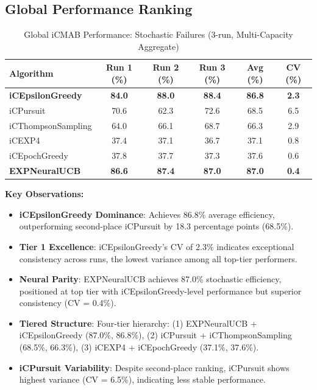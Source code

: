 \documentclass[12pt,a4paper]{article}
\newcommand{\primarytext}[1]{\textcolor{primaryblue}{\textbf{#1}}}
\newcommand{\secondarytext}[1]{\textcolor{secondaryblue}{\textbf{#1}}}
\newcommand{\warning}[1]{\textcolor{warningred}{\textbf{#1}}}
\newcommand{\legacy}[1]{\textcolor{legacycolor}{\textbf{#1}}}
\begin{document}
\begin{tcolorbox}[colback=tableheader,colframe=primaryblue,title=\textbf{Primary iCMAB Performance Results (Stochastic Environment, Attack Rate: 0.25)}]

\subsection{Global Performance Ranking}

\begin{table}[H]
\centering
\caption{Global iCMAB Performance: Stochastic Failures (3-run, Multi-Capacity Aggregate)}
\label{tab:global-performance-stochastic}
\begin{tabular}{@{}lccccc@{}}
\toprule
\textbf{Algorithm} & \textbf{Run 1 (\%)} & \textbf{Run 2 (\%)} & \textbf{Run 3 (\%)} & \textbf{Avg (\%)} & \textbf{CV (\%)} \\
\midrule
\primarytext{iCEpsilonGreedy}   & \primarytext{84.0} & \primarytext{88.0} & \primarytext{88.4} & \primarytext{86.8} & \primarytext{2.3} \\
iCPursuit                       & 70.6 & 62.3 & 72.6 & 68.5 & 6.5 \\
iCThompsonSampling              & 64.0 & 66.1 & 68.7 & 66.3 & 2.9 \\
iCEXP4                          & 37.4 & 37.1 & 36.7 & 37.1 & 0.8 \\
iCEpochGreedy                   & 37.8 & 37.7 & 37.3 & 37.6 & 0.6 \\
\legacy{EXPNeuralUCB}           & \legacy{86.6} & \legacy{87.4} & \legacy{87.0} & \legacy{87.0} & \legacy{0.4} \\
\bottomrule
\end{tabular}
\end{table}

\textbf{Key Observations:}
\begin{itemize}
\item \primarytext{iCEpsilonGreedy Dominance}: Achieves 86.8\% average efficiency, outperforming second-place iCPursuit by 18.3 percentage points (68.5\%).
\item \primarytext{Tier 1 Excellence}: iCEpsilonGreedy's CV of 2.3\% indicates exceptional consistency across runs, the lowest variance among all top-tier performers.
\item \legacy{Neural Parity}: EXPNeuralUCB achieves 87.0\% stochastic efficiency, positioned at top tier with iCEpsilonGreedy-level performance but superior consistency (CV = 0.4\%).
\item \secondarytext{Tiered Structure}: Four-tier hierarchy: (1) EXPNeuralUCB + iCEpsilonGreedy (87.0\%, 86.8\%), (2) iCPursuit + iCThompsonSampling (68.5\%, 66.3\%), (3) iCEXP4 + iCEpochGreedy (37.1\%, 37.6\%).
\item \warning{iCPursuit Variability}: Despite second-place ranking, iCPursuit shows highest variance (CV = 6.5\%), indicating less stable performance.
\end{itemize}
\end{tcolorbox}
\end{document}
